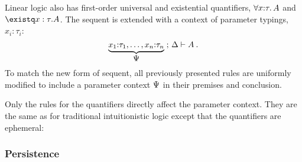 \ExplSyntaxOn
{}
\ExplSyntaxOff
\NewDocumentCommand{\tctx}{}{\Psi}
Linear logic also has first-order universal and existential quantifiers, $\univq x:\tau.A$ and $\existq x:\tau.A$.
The sequent is extended with a context of parameter typings, $x_i{:}\tau_i$:
\begin{equation*}
  \underbrace{x_1{:}\tau_1, \dotsc, x_n{:}\tau_n}_{\displaystyle \tctx} \;;\, \lctx \seq A \:.
\end{equation*}
To match the new form of sequent, all previously presented rules are uniformly modified to include a parameter context $\tctx$ in their premises and conclusion.

Only the rules for the quantifiers directly affect the parameter context.
They are the same as for traditional intuitionistic logic except that the quantifiers are ephemeral:

\subsubsection{Persistence}\label{sec:persistence}

